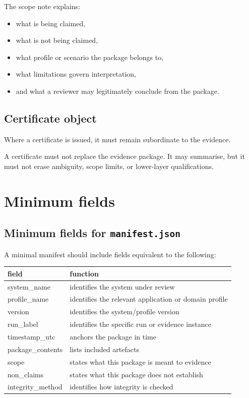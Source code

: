 \documentclass[11pt]{article}
\begin{document}
The scope note explains:
\begin{itemize}[leftmargin=2em]
    \item what is being claimed,
    \item what is not being claimed,
    \item what profile or scenario the package belongs to,
    \item what limitations govern interpretation,
    \item and what a reviewer may legitimately conclude from the package.
\end{itemize}

\subsection{Certificate object}

Where a certificate is issued, it must remain subordinate to the evidence.

A certificate must not replace the evidence package. It may summarise, but it must not erase ambiguity, scope limits, or lower-layer qualifications.

\section{Minimum fields}

\subsection{Minimum fields for \texttt{manifest.json}}

A minimal manifest should include fields equivalent to the following:

\begin{center}
\begin{tabular}{>{\ttfamily}p{4cm} p{9cm}}
\toprule
field & function \\
\midrule
system\_name & identifies the system under review \\
profile\_name & identifies the relevant application or domain profile \\
version & identifies the system/profile version \\
run\_label & identifies the specific run or evidence instance \\
timestamp\_utc & anchors the package in time \\
package\_contents & lists included artefacts \\
scope & states what this package is meant to evidence \\
non\_claims & states what this package does not establish \\
integrity\_method & identifies how integrity is checked \\
\bottomrule
\end{tabular}
\end{center}
\end{document}
